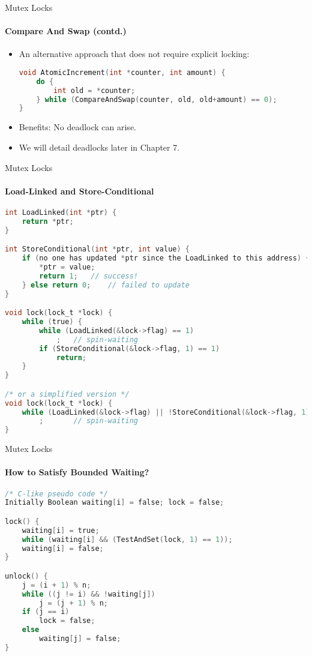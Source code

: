 \documentclass[10pt]{beamer}
\begin{document}
\begin{frame}[fragile]{Mutex Locks}
\framesubtitle{Compare And Swap (contd.)}
 
\begin{itemize}
\item An alternative approach that does not require explicit locking:
\vspace{6pt}\\
\begin{lstlisting}[language=C]
void AtomicIncrement(int *counter, int amount) {
	do {
		int old = *counter;
	} while (CompareAndSwap(counter, old, old+amount) == 0);
}
\end{lstlisting}
\item Benefits: No deadlock can arise.
\item We will detail deadlocks later in Chapter 7.
\end{itemize}
\end{frame}

\begin{frame}[fragile]{Mutex Locks}
\framesubtitle{Load-Linked and Store-Conditional}
\begin{lstlisting}[language=C]
int LoadLinked(int *ptr) {
	return *ptr;
}

int StoreConditional(int *ptr, int value) {
	if (no one has updated *ptr since the LoadLinked to this address) {
		*ptr = value;
		return 1;	// success!
	} else return 0;	// failed to update
}

void lock(lock_t *lock) {
	while (true) {
		while (LoadLinked(&lock->flag) == 1)
			;	// spin-waiting
		if (StoreConditional(&lock->flag, 1) == 1)
			return;
	}
}

/* or a simplified version */
void lock(lock_t *lock) {
	while (LoadLinked(&lock->flag) || !StoreConditional(&lock->flag, 1))
		;		// spin-waiting
}
\end{lstlisting}
\end{frame}

\begin{frame}[fragile]{Mutex Locks}
\framesubtitle{How to Satisfy Bounded Waiting?}
\begin{lstlisting}[language=C]
/* C-like pseudo code */
Initially Boolean waiting[i] = false; lock = false;

lock() {
	waiting[i] = true;
	while (waiting[i] && (TestAndSet(lock, 1) == 1));
	waiting[i] = false;
}

unlock() {
	j = (i + 1) % n;
	while ((j != i) && !waiting[j])
		j = (j + 1) % n;
	if (j == i)
		lock = false;
	else
		waiting[j] = false;
}
\end{lstlisting}
\end{frame}
\end{document}
